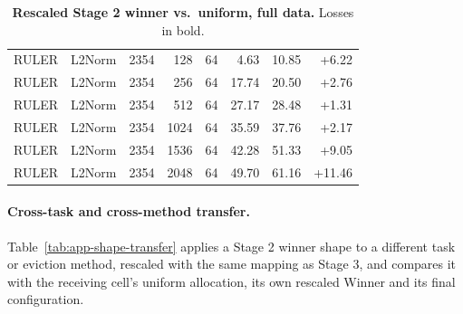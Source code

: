 \begin{table}[t]
\begin{tabular}{@{}l l r r r r r r@{}}
    RULER & L2Norm & 2354 & 128 & 64 & 4.63 & 10.85 & +6.22 \\
    RULER & L2Norm & 2354 & 256 & 64 & 17.74 & 20.50 & +2.76 \\
    RULER & L2Norm & 2354 & 512 & 64 & 27.17 & 28.48 & +1.31 \\
    RULER & L2Norm & 2354 & 1024 & 64 & 35.59 & 37.76 & +2.17 \\
    RULER & L2Norm & 2354 & 1536 & 64 & 42.28 & 51.33 & +9.05 \\
    RULER & L2Norm & 2354 & 2048 & 64 & 49.70 & 61.16 & +11.46 \\
    \bottomrule
  \end{tabular}
  \caption{\textbf{Rescaled Stage 2 winner vs.\ uniform, full data.} Losses in bold.}
  \label{tab:app-transfer}
\end{table}


\paragraph{Cross-task and cross-method transfer.} Table~\ref{tab:app-shape-transfer} applies a Stage 2 winner shape to a different task or eviction method, rescaled with the same mapping as Stage 3, and compares it with the receiving cell's uniform allocation, its own rescaled Winner and its final configuration.

